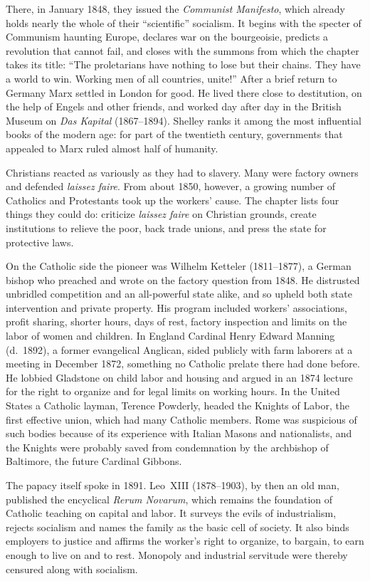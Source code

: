 There, in January 1848, they issued the \emph{Communist Manifesto}, which already holds nearly the
whole of their ``scientific'' socialism. It begins with the specter of Communism haunting Europe,
declares war on the bourgeoisie, predicts a revolution that cannot fail, and closes with the summons
from which the chapter takes its title: ``The proletarians have nothing to lose but their chains.
They have a world to win. Working men of all countries, unite!'' After a brief return to Germany Marx
settled in London for good. He lived there close to destitution, on the help of Engels and other
friends, and worked day after day in the British Museum on \emph{Das Kapital} (1867--1894). Shelley
ranks it among the most influential books of the modern age: for part of the twentieth century,
governments that appealed to Marx ruled almost half of humanity.

Christians reacted as variously as they had to slavery. Many were factory owners and defended
\emph{laissez faire}. From about 1850, however, a growing number of Catholics and Protestants took up
the workers' cause. The chapter lists four things they could do: criticize \emph{laissez faire} on
Christian grounds, create institutions to relieve the poor, back trade unions, and press the state
for protective laws.

On the Catholic side the pioneer was Wilhelm Ketteler (1811--1877), a German bishop who preached and
wrote on the factory question from 1848. He distrusted unbridled competition and an all-powerful
state alike, and so upheld both state intervention and private property. His program included
workers' associations, profit sharing, shorter hours, days of rest, factory inspection and limits on
the labor of women and children. In England Cardinal Henry Edward Manning (d.~1892), a former
evangelical Anglican, sided publicly with farm laborers at a meeting in December 1872, something no
Catholic prelate there had done before. He lobbied Gladstone on child labor and housing and argued in
an 1874 lecture for the right to organize and for legal limits on working hours. In the United States
a Catholic layman, Terence Powderly, headed the Knights of Labor, the first effective union, which
had many Catholic members. Rome was suspicious of such bodies because of its experience with Italian
Masons and nationalists, and the Knights were probably saved from condemnation by the archbishop of
Baltimore, the future Cardinal Gibbons.

The papacy itself spoke in 1891. Leo~XIII (1878--1903), by then an old man, published the encyclical
\emph{Rerum Novarum}, which remains the foundation of Catholic teaching on capital and labor. It
surveys the evils of industrialism, rejects socialism and names the family as the basic cell of
society. It also binds employers to justice and affirms the worker's right to organize, to bargain,
to earn enough to live on and to rest. Monopoly and industrial servitude were thereby censured along
with socialism.

